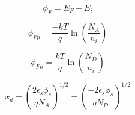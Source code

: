 \documentclass{infosheet}
\begin{document}
\begin{displaymath}
  \phi_F = E_F - E_i
\end{displaymath}

\begin{multicols}{2}
  \begin{displaymath}
    \phi_{Fp} = \frac{-kT}{q}\ln\left(\frac{N_A}{n_i}\right)
  \end{displaymath}
  
  \begin{displaymath}
    \phi_{Fn} = \frac{kT}{q}\ln\left(\frac{N_D}{n_i}\right)
  \end{displaymath}
\end{multicols}

\begin{displaymath}
  x_d = \left(\frac{2\epsilon_s\phi_s}{qN_A}\right)^{1/2} = \left(\frac{-2\epsilon_s\phi_s}{qN_D}\right)^{1/2}
\end{displaymath}

\lipsum[1-4]
\end{document}
